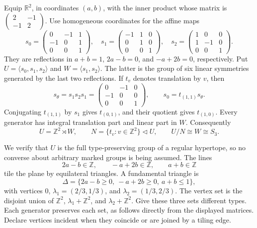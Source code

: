 \documentclass[11pt,a4paper]{article}
\newcommand{\gen}[1]{\langle #1\rangle}
\begin{document}
Equip $\mathbb R^2$, in coordinates $(a,b)$, with the inner product
whose matrix is $\left(\begin{smallmatrix}2&-1\\-1&2\end{smallmatrix}\right)$.
Use homogeneous coordinates for the affine maps
\[
 s_0=\begin{pmatrix}0&-1&1\\-1&0&1\\0&0&1\end{pmatrix},\quad
 s_1=\begin{pmatrix}-1&1&0\\0&1&0\\0&0&1\end{pmatrix},\quad
 s_2=\begin{pmatrix}1&0&0\\1&-1&0\\0&0&1\end{pmatrix}.
\]
They are reflections in $a+b=1$, $2a-b=0$, and $-a+2b=0$,
respectively. Put $U=\gen{s_0,s_1,s_2}$ and $W=\gen{s_1,s_2}$.
The latter is the group of six linear symmetries generated by the
last two reflections. If $t_v$ denotes translation by $v$, then
\[
 s_\theta=s_1s_2s_1=\begin{pmatrix}0&-1&0\\-1&0&0\\0&0&1\end{pmatrix},
 \qquad s_0=t_{(1,1)}s_\theta.
\]
Conjugating $t_{(1,1)}$ by $s_1$ gives $t_{(0,1)}$, and their quotient
gives $t_{(1,0)}$. Every generator has integral translation part and
linear part in $W$. Consequently
\begin{equation}\label{semidirect}
 U=\mathbb Z^2\rtimes W,
 \qquad N=\{t_v:v\in\mathbb Z^2\}\triangleleft U,
 \qquad U/N\cong W\cong S_3.
\end{equation}

We verify that $U$ is the full type-preserving group of a regular
hypertope, so no converse about arbitrary marked groups is being
assumed. The lines
\[
 2a-b\in\mathbb Z,\qquad -a+2b\in\mathbb Z,\qquad a+b\in\mathbb Z
\]
tile the plane by equilateral triangles. A fundamental triangle is
\[
 \Delta=\{2a-b\geq0,\ -a+2b\geq0,\ a+b\leq1\},
\]
with vertices $0$, $\lambda_1=(2/3,1/3)$, and
$\lambda_2=(1/3,2/3)$. The vertex set is the disjoint union of
$\mathbb Z^2$, $\lambda_1+\mathbb Z^2$, and
$\lambda_2+\mathbb Z^2$. Give these three sets different types.
Each generator preserves each set, as follows directly from the
displayed matrices. Declare vertices incident when they coincide or
are joined by a tiling edge.
\end{document}
